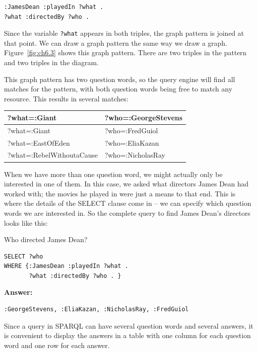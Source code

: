 \begin{lstlisting}
:JamesDean :playedIn ?what .
?what :directedBy ?who .
\end{lstlisting}

Since the variable \texttt{?what} appears in both triples, the graph pattern is
joined at that point. We can draw a graph pattern the same way we draw a
graph. Figure~\ref{fig:ch6.3} shows this graph pattern. There are two triples in the
pattern and two triples in the diagram.

This graph pattern has two question words, so the query engine will find
all matches for the pattern, with both question words being free to
match any resource. This results in several matches:

\begin{tabular}{|l l| }
\hline
?what=:Giant&?who=:GeorgeStevens\\
\hline
?what=:Giant&?who=:FredGuiol \\
\hline
?what=:EastOfEden&?who=:EliaKazan \\
\hline
?what=:RebelWithoutaCause&?who=:NicholasRay \\
\hline
\end{tabular}

When we have more than one question word, we might actually only be
interested in one of them. In this case, we asked what directors James
Dean had worked with; the movies he played in were just a means to that
end. This is where the details of the SELECT clause come in -- we can
specify which question words we are interested in. So the complete query
to find James Dean's directors looks like this:

\begin{query}Who directed James Dean?\end{query}

\begin{lstlisting}
SELECT ?who
WHERE {:JamesDean :playedIn ?what .
       ?what :directedBy ?who . }
\end{lstlisting}

\textbf{\textbf{Answer:}}

\begin{lstlisting}
:GeorgeStevens, :EliaKazan, :NicholasRay, :FredGuiol
\end{lstlisting}

Since a query in SPARQL can have several question words and several
answers, it is convenient to display the answers in a table with one
column for each question word and one row for each answer.


